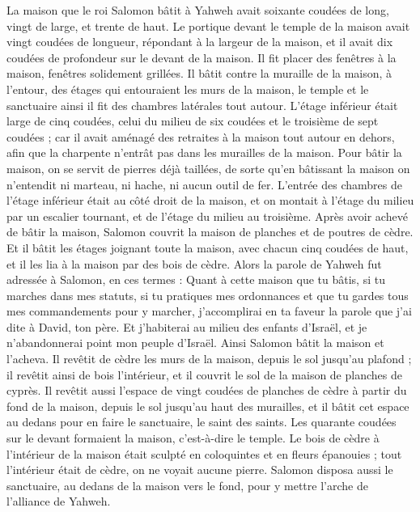 \begin{multicols}{2}
La maison que le roi Salomon bâtit à Yahweh avait soixante coudées de long, vingt de large, et trente de haut.
Le portique devant le temple de la maison avait vingt coudées de longueur, répondant à la largeur de la maison, et il avait dix coudées de profondeur sur le devant de la maison.
Il fit placer des fenêtres à la maison, fenêtres solidement grillées.
Il bâtit contre la muraille de la maison, à l’entour, des étages qui entouraient les murs de la maison, le temple et le sanctuaire ainsi il fit des chambres latérales tout autour.
L’étage inférieur était large de cinq coudées, celui du milieu de six coudées et le troisième de sept coudées ; car il avait aménagé des retraites à la maison tout autour en dehors, afin que la charpente n'entrât pas dans les murailles de la maison.
Pour bâtir la maison, on se servit de pierres déjà taillées, de sorte qu'en bâtissant la maison on n'entendit ni marteau, ni hache, ni aucun outil de fer.
L'entrée des chambres de l’étage inférieur était au côté droit de la maison, et on montait à l’étage du milieu par un escalier tournant, et de l’étage du milieu au troisième.
Après avoir achevé de bâtir la maison, Salomon couvrit la maison de planches et de poutres de cèdre.
Et il bâtit les étages joignant toute la maison, avec chacun cinq coudées de haut, et il les lia à la maison par des bois de cèdre.
Alors la parole de Yahweh fut adressée à Salomon, en ces termes :
Quant à cette maison que tu bâtis, si tu marches dans mes statuts, si tu pratiques mes ordonnances et que tu gardes tous mes commandements pour y marcher, j’accomplirai en ta faveur la parole que j'ai dite à David, ton père.
Et j'habiterai au milieu des enfants d'Israël, et je n'abandonnerai point mon peuple d'Israël.
Ainsi Salomon bâtit la maison et l'acheva.
Il revêtit de cèdre les murs de la maison, depuis le sol jusqu'au plafond ; il revêtit ainsi de bois l’intérieur, et il couvrit le sol de la maison de planches de cyprès.
Il revêtit aussi l'espace de vingt coudées de planches de cèdre à partir du fond de la maison, depuis le sol jusqu'au haut des murailles, et il bâtit cet espace au dedans pour en faire le sanctuaire, le saint des saints.
Les quarante coudées sur le devant formaient la maison, c’est-à-dire le temple.
Le bois de cèdre à l’intérieur de la maison était sculpté en coloquintes et en fleurs épanouies ; tout l’intérieur était de cèdre, on ne voyait aucune pierre.
Salomon disposa aussi le sanctuaire, au dedans de la maison vers le fond, pour y mettre l'arche de l'alliance de Yahweh.

\end{multicols}
